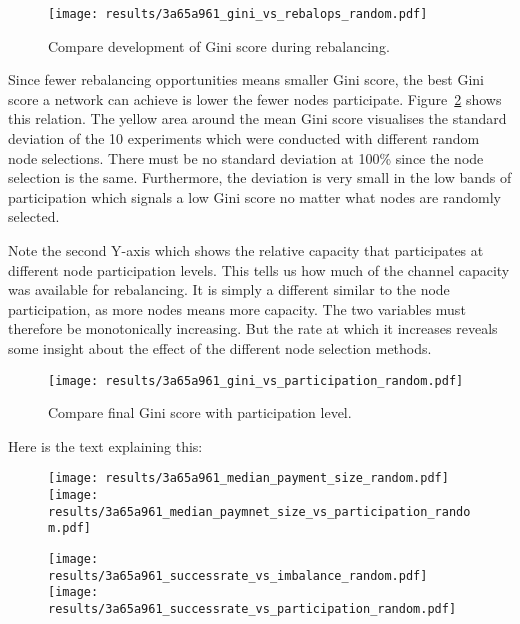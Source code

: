 \documentclass[final]{fhnwreport}       %
\begin{document}
\begin{figure}[H]
\centering
\texttt{[image: results/3a65a961\_gini\_vs\_rebalops\_random.pdf]}
\caption{Compare development of Gini score during rebalancing.}
\label{fig:gini_rebal_rand}
\end{figure}

Since fewer rebalancing opportunities means smaller Gini score, the best Gini score a network can achieve is lower the fewer nodes participate. Figure~\ref{fig:gini_part_rand} shows this relation. The yellow area around the mean Gini score visualises the standard deviation of the 10 experiments which were conducted with different random node selections. There must be no standard deviation at 100\% since the node selection is the same. Furthermore, the deviation is very small in the low bands of participation which signals a low Gini score no matter what nodes are randomly selected. 

Note the second Y-axis which shows the relative capacity that participates at different node participation levels. This tells us how much of the channel capacity was available for rebalancing. It is simply a different similar to the node participation, as more nodes means more capacity. The two variables must therefore be monotonically increasing. But the rate at which it increases reveals some insight about the effect of the different node selection methods. 

\begin{figure}[H]
\centering
\texttt{[image: results/3a65a961\_gini\_vs\_participation\_random.pdf]}
\caption{Compare final Gini score with participation level.}
\label{fig:gini_part_rand}
\end{figure}

Here is the text explaining this:

\begin{figure}[htp]
\centering
\texttt{[image: results/3a65a961\_median\_payment\_size\_random.pdf]}\hfill
\texttt{[image: results/3a65a961\_median\_paymnet\_size\_vs\_participation\_random.pdf]}
\label{fig:pay_size_part}
\end{figure}

\begin{figure}[htp]
\centering
\texttt{[image: results/3a65a961\_successrate\_vs\_imbalance\_random.pdf]}\hfill
\texttt{[image: results/3a65a961\_successrate\_vs\_participation\_random.pdf]}
\label{fig:success_part}
\end{figure}
\end{document}
